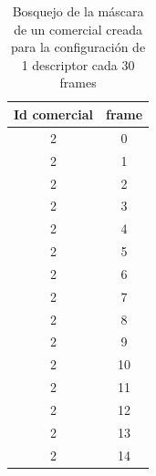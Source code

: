 \documentclass[14pt,letterpaper,hidelinks]{extarticle}
\begin{document}
\begin{table}[]
\centering
\begin{tabular}{@{}cc@{}}
\toprule
Id comercial & frame \\ \midrule
2 & 0 \\
2 & 1 \\
2 & 2 \\
2 & 3 \\
2 & 4 \\
2 & 5 \\
2 & 6 \\
2 & 7 \\
2 & 8 \\
2 & 9 \\
2 & 10 \\
2 & 11 \\
2 & 12 \\
2 & 13 \\
2 & 14 \\ \bottomrule
\end{tabular}
\captionsetup{justification=centering,margin=2cm}
\caption{Bosquejo de la máscara de un comercial creada para la configuración de 1 descriptor cada 30 frames\label{tab:mask}}
\end{table}
\end{document}
